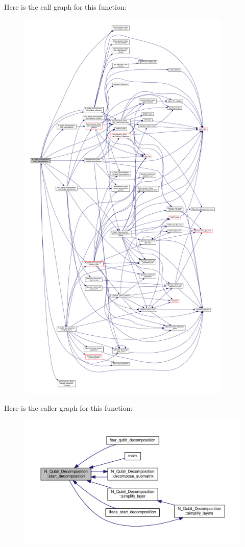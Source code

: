 Here is the call graph for this function\+:
\nopagebreak
\begin{figure}[H]
\begin{center}
\leavevmode
\includegraphics[height=550pt]{class_n___qubit___decomposition_ae7fd1992d645a7ff41c02e48ba1dc5ad_cgraph}
\end{center}
\end{figure}




Here is the caller graph for this function\+:
\nopagebreak
\begin{figure}[H]
\begin{center}
\leavevmode
\includegraphics[width=350pt]{class_n___qubit___decomposition_ae7fd1992d645a7ff41c02e48ba1dc5ad_icgraph}
\end{center}
\end{figure}


